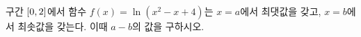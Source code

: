 구간 $[0{,}\mkern3mu\mathopen{}2]$에서 함수 $f(x)=\ln(x^2-x+4)$는 $x=a$에서 최댓값을 갖고, $x=b$에서 최솟값을 갖는다. 이때 $a-b$의 값을 구하시오.
